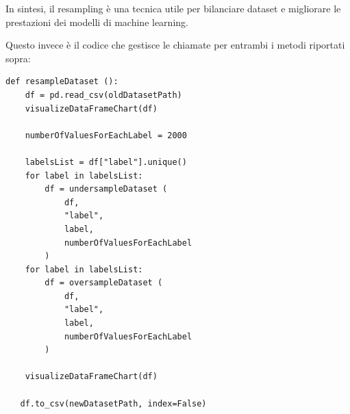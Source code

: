 In sintesi, il resampling è una tecnica utile per bilanciare dataset e migliorare le prestazioni dei modelli di machine learning. 

Questo invece è il codice che gestisce le chiamate per entrambi i metodi riportati sopra:
\begin{verbatim}
def resampleDataset ():
    df = pd.read_csv(oldDatasetPath)
    visualizeDataFrameChart(df)

    numberOfValuesForEachLabel = 2000

    labelsList = df["label"].unique()
    for label in labelsList:
        df = undersampleDataset (
            df, 
            "label", 
            label, 
            numberOfValuesForEachLabel
        )
    for label in labelsList:
        df = oversampleDataset (
            df, 
            "label", 
            label, 
            numberOfValuesForEachLabel
        )

    visualizeDataFrameChart(df)

   df.to_csv(newDatasetPath, index=False)
\end{verbatim}

